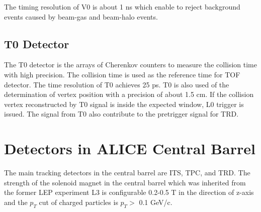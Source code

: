The timing resolution of V0 is about 1 ns which enable to reject background events caused by beam-gas and beam-halo events. 


\subsection{T0 Detector}
The T0 detector is the arrays of Cherenkov counters to measure the collision time with high precision. 
The collision time is used as the reference time for TOF detector. 
The time resolution of T0 achieves 25 ps. 
T0 is also used of the determination of vertex position with a precision of about 1.5 cm. 
If the collision vertex reconstructed by T0 signal is inside the expected window, L0 trigger is issued.  
The signal from T0 also contribute to the pretrigger signal for TRD. 

\section{Detectors in ALICE Central Barrel}
\label{sec_3_ALICEcentral}
The main tracking detectors in the central barrel are ITS, TPC, and TRD. 
The strength of the solenoid magnet in the central barrel which was inherited from the former LEP experiment L3 is configurable 0.2-0.5 T in the direction of z-axis and the $p_{T}$ cut of charged particles is $p_{T}>$ 0.1 GeV/c. 
